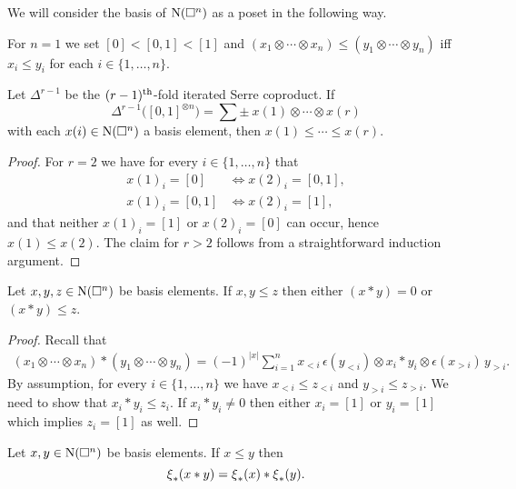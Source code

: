 We will consider the basis of $\operatorname{N}(\square^n)$ as a poset in the following way.

\begin{definition} \label{d:partial order}
	For $n = 1$ we set $[0] < [0,1] < [1]$ and $(x_1 \otimes \cdots \otimes x_n) \leq (y_1 \otimes \cdots \otimes y_n)$ iff $x_i \leq y_i$ for each $i \in \{1, \dots, n\}$.
\end{definition}

\begin{lemma}
	Let $\Delta^{r-1}$ be the $(r-1)^{\mathrm{th}}$-fold iterated Serre coproduct.
	If
	\[
	\Delta^{r-1} \big([0,1]^{\otimes n}\big) =
	\sum \pm \ x{(1)} \otimes \cdots \otimes x{(r)}
	\]
	with each $x(i) \in \operatorname{N}(\square^n)$ a basis element, then $x{(1)} \leq \cdots \leq x{(r)}$.
\end{lemma}

\begin{proof}
	For $r = 2$ we have for every $i \in \{1, \dots, n\}$ that
	\begin{align*}
	x(1)_i = [0]   & \iff x(2)_i = [0,1], \\
	x(1)_i = [0,1] & \iff x(2)_i = [1],
	\end{align*}
	and that neither $x(1)_i = [1]$ or $x(2)_i = [0]$ can occur, hence $x(1) \leq x(2)$.
	The claim for $r > 2$ follows from a straightforward induction argument.
\end{proof}

\begin{lemma}
	Let $x, y, z \in \operatorname{N}(\square^n)$ be basis elements.
	If $x, y \leq z$ then either $(x \ast y) = 0$ or $(x \ast y) \leq z$.
\end{lemma}

\begin{proof}
	Recall that
	\begin{align*}
	(x_1 \otimes \cdots \otimes x_n) \ast (y_1 \otimes \cdots \otimes y_n) =
	(-1)^{|x|} \sum_{i=1}^n x_{<i}\, \epsilon(y_{<i}) \otimes x_i \ast y_i \otimes \epsilon(x_{>i}) \, y_{>i}.
	\end{align*}
	By assumption, for every $i \in \{1, \dots, n\}$ we have $x_{<i} \leq z_{<i}$ and $y_{>i} \leq z_{>i}$.
	We need to show that $x_i \ast y_i \leq z_i$.
	If $x_i \ast y_i \neq 0$ then either $x_i = [1]$ or $y_i = [1]$ which implies $z_i = [1]$ as well.
\end{proof}

\begin{lemma}
	Let $x, y \in \operatorname{N}(\square^n)$ be basis elements.
	If $x \leq y$ then
	\begin{equation} \label{e:cs collapse as algebra map}
	\operatorname{\xi}_\ast(x \ast y) = \operatorname{\xi}_\ast(x) \ast \operatorname{\xi}_\ast(y).
	\end{equation}
\end{lemma}

